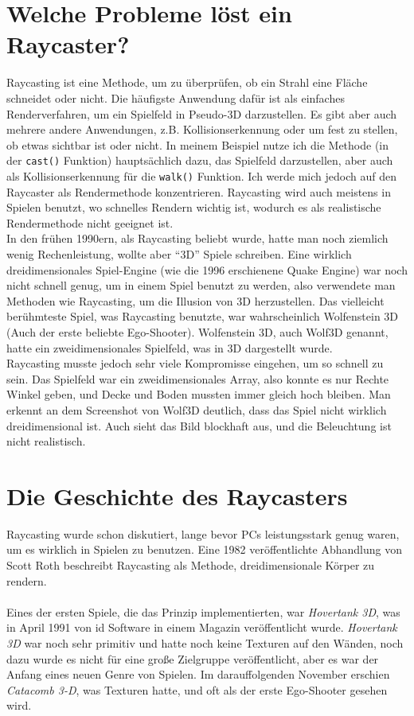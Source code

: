 \documentclass[a4paper,12pt]{report}
\begin{document}
\section{Welche Probleme löst ein Raycaster?}
Raycasting ist eine Methode, um zu überprüfen, ob ein Strahl eine Fläche schneidet oder nicht. Die häufigste Anwendung dafür ist als einfaches Renderverfahren, um ein Spielfeld in Pseudo-3D darzustellen. Es gibt aber auch mehrere andere Anwendungen, z.B. Kollisionserkennung oder um fest zu stellen, ob etwas sichtbar ist oder nicht. In meinem Beispiel nutze ich die Methode (in der \texttt{cast()} Funktion) hauptsächlich dazu, das Spielfeld darzustellen, aber auch als Kollisionserkennung für die \texttt{walk()} Funktion. Ich werde mich jedoch auf den Raycaster als Rendermethode konzentrieren. Raycasting wird auch meistens in Spielen benutzt, wo schnelles Rendern wichtig ist, wodurch es als realistische Rendermethode nicht geeignet ist. \\
In den frühen 1990ern, als Raycasting beliebt wurde, hatte man noch ziemlich wenig Rechenleistung, wollte aber ``3D'' Spiele schreiben. Eine wirklich dreidimensionales Spiel-Engine (wie die 1996 erschienene Quake Engine) war noch nicht schnell genug, um in einem Spiel benutzt zu werden, also verwendete man Methoden wie Raycasting, um die Illusion von 3D herzustellen. Das vielleicht berühmteste Spiel, was Raycasting benutzte, war wahrscheinlich Wolfenstein 3D (Auch der erste beliebte Ego-Shooter). Wolfenstein 3D, auch Wolf3D genannt, hatte ein zweidimensionales Spielfeld, was in 3D dargestellt wurde. \\
Raycasting musste jedoch sehr viele Kompromisse eingehen, um so schnell zu sein. Das Spielfeld war ein zweidimensionales Array, also konnte es nur Rechte Winkel geben, und Decke und Boden mussten immer gleich hoch bleiben. Man erkennt an dem Screenshot von Wolf3D deutlich, dass das Spiel nicht wirklich dreidimensional ist. Auch sieht das Bild blockhaft aus, und die Beleuchtung ist nicht realistisch.

\section{Die Geschichte des Raycasters}
Raycasting wurde schon diskutiert, lange bevor PCs leistungsstark genug waren, um es wirklich in Spielen zu benutzen. Eine 1982 veröffentlichte Abhandlung von Scott Roth beschreibt Raycasting als Methode, dreidimensionale Körper zu rendern.
\paragraph*{}
Eines der ersten Spiele, die das Prinzip implementierten, war \textit{Hovertank 3D}, was in April 1991 von id Software in einem Magazin veröffentlicht wurde. \textit{Hovertank 3D} war noch sehr primitiv und hatte noch keine Texturen auf den Wänden, noch dazu wurde es nicht für eine große Zielgruppe veröffentlicht, aber es war der Anfang eines neuen Genre von Spielen. Im darauffolgenden November erschien \textit{Catacomb 3-D}, was Texturen hatte, und oft als der erste Ego-Shooter gesehen wird.
\end{document}
